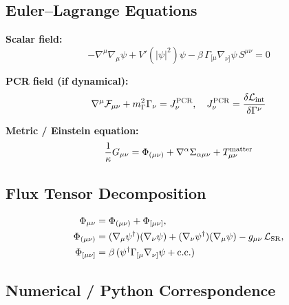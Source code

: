 \documentclass[12pt]{article}
\begin{document}
\subsection{Euler--Lagrange Equations}
\textbf{Scalar field:}
\begin{equation}
-\nabla^\mu\nabla_\mu\psi + V'(|\psi|^2)\psi 
- \beta\, \Gamma_{[\mu}\nabla_{\nu]}\psi\, S^{\mu\nu} = 0
\end{equation}

\textbf{PCR field (if dynamical):}
\begin{equation}
\nabla^\mu \mathcal{F}_{\mu\nu} + m_\Gamma^2 \Gamma_\nu = J_\nu^{\rm PCR}, 
\quad 
J_\nu^{\rm PCR} = \frac{\delta \mathcal{L}_{\rm int}}{\delta \Gamma^\nu}
\end{equation}

\textbf{Metric / Einstein equation:}
\begin{equation}
\frac{1}{\kappa} G_{\mu\nu} = \Phi_{(\mu\nu)} + \nabla^\alpha \Sigma_{\alpha\mu\nu} + T^{\rm matter}_{\mu\nu}
\end{equation}

\subsection{Flux Tensor Decomposition}
\begin{align}
\Phi_{\mu\nu} &= \Phi_{(\mu\nu)} + \Phi_{[\mu\nu]}, \\
\Phi_{(\mu\nu)} &= (\nabla_\mu\psi^\dagger)(\nabla_\nu\psi) + (\nabla_\nu\psi^\dagger)(\nabla_\mu\psi) - g_{\mu\nu}\,\mathcal{L}_{\rm SR}, \\
\Phi_{[\mu\nu]} &= \beta\,(\psi^\dagger \Gamma_{[\mu}\nabla_{\nu]}\psi + \mathrm{c.c.})
\end{align}

\subsection{Numerical / Python Correspondence}
\end{document}
